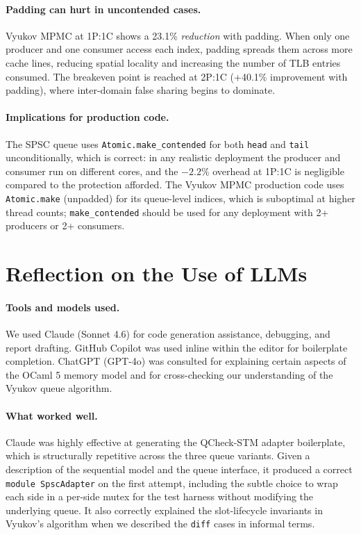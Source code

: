 \documentclass[11pt,a4paper]{article}
\begin{document}
\paragraph{Padding can hurt in uncontended cases.} Vyukov MPMC at 1P:1C shows a 23.1\%
\emph{reduction} with padding. When only one producer and one consumer access each index,
padding spreads them across more cache lines, reducing spatial locality and increasing
the number of TLB entries consumed. The breakeven point is reached at 2P:1C (+40.1\%
improvement with padding), where inter-domain false sharing begins to dominate.

\paragraph{Implications for production code.} The SPSC queue uses \texttt{Atomic.make\_contended}
for both \texttt{head} and \texttt{tail} unconditionally, which is correct: in any realistic
deployment the producer and consumer run on different cores, and the $-2.2\%$ overhead
at 1P:1C is negligible compared to the protection afforded. The Vyukov MPMC production
code uses \texttt{Atomic.make} (unpadded) for its queue-level indices, which is
suboptimal at higher thread counts; \texttt{make\_contended} should be used for any
deployment with 2+ producers or 2+ consumers.

\section{Reflection on the Use of LLMs}
\label{sec:llm}

\paragraph{Tools and models used.}
We used Claude (Sonnet 4.6) for code generation assistance, debugging, and report drafting.
GitHub Copilot was used inline within the editor for boilerplate completion. ChatGPT (GPT-4o)
was consulted for explaining certain aspects of the OCaml 5 memory model and for
cross-checking our understanding of the Vyukov queue algorithm.

\paragraph{What worked well.}
Claude was highly effective at generating the QCheck-STM adapter boilerplate, which is
structurally repetitive across the three queue variants. Given a description of the
sequential model and the queue interface, it produced a correct \texttt{module SpscAdapter}
on the first attempt, including the subtle choice to wrap each side in a per-side mutex
for the test harness without modifying the underlying queue. It also correctly explained
the slot-lifecycle invariants in Vyukov's algorithm when we described the \texttt{diff}
cases in informal terms.
\end{document}
